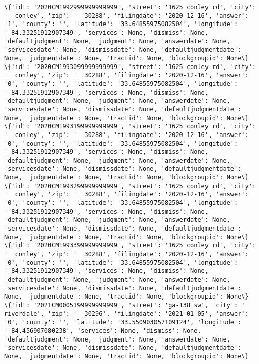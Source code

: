 \documentclass[11pt]{article}
\begin{document}
\begin{Verbatim}[commandchars=\\\{\}]
\{'id': '2020CM1992999999999999', 'street': '1625 conley rd', 'city': '  conley', 'zip': '  30288', 'filingdate': '2020-12-16', 'answer': '1', 'county': '', 'latitude': '33.64855975082504', 'longitude': '-84.33251912907349', 'services': None, 'dismiss': None, 'defaultjudgment': None, 'judgment': None, 'answerdate': None, 'servicesdate': None, 'dismissdate': None, 'defaultjudgmentdate': None, 'judgmentdate': None, 'tractid': None, 'blockgroupid': None\}
\{'id': '2020CM1993099999999999', 'street': '1625 conley rd', 'city': '  conley', 'zip': '  30288', 'filingdate': '2020-12-16', 'answer': '0', 'county': '', 'latitude': '33.64855975082504', 'longitude': '-84.33251912907349', 'services': None, 'dismiss': None, 'defaultjudgment': None, 'judgment': None, 'answerdate': None, 'servicesdate': None, 'dismissdate': None, 'defaultjudgmentdate': None, 'judgmentdate': None, 'tractid': None, 'blockgroupid': None\}
\{'id': '2020CM1993199999999999', 'street': '1625 conley rd', 'city': '  conley', 'zip': '  30288', 'filingdate': '2020-12-16', 'answer': '0', 'county': '', 'latitude': '33.64855975082504', 'longitude': '-84.33251912907349', 'services': None, 'dismiss': None, 'defaultjudgment': None, 'judgment': None, 'answerdate': None, 'servicesdate': None, 'dismissdate': None, 'defaultjudgmentdate': None, 'judgmentdate': None, 'tractid': None, 'blockgroupid': None\}
\{'id': '2020CM1993299999999999', 'street': '1625 conley rd', 'city': '  conley', 'zip': '  30288', 'filingdate': '2020-12-16', 'answer': '0', 'county': '', 'latitude': '33.64855975082504', 'longitude': '-84.33251912907349', 'services': None, 'dismiss': None, 'defaultjudgment': None, 'judgment': None, 'answerdate': None, 'servicesdate': None, 'dismissdate': None, 'defaultjudgmentdate': None, 'judgmentdate': None, 'tractid': None, 'blockgroupid': None\}
\{'id': '2020CM1993399999999999', 'street': '1625 conley rd', 'city': '  conley', 'zip': '  30288', 'filingdate': '2020-12-16', 'answer': '0', 'county': '', 'latitude': '33.64855975082504', 'longitude': '-84.33251912907349', 'services': None, 'dismiss': None, 'defaultjudgment': None, 'judgment': None, 'answerdate': None, 'servicesdate': None, 'dismissdate': None, 'defaultjudgmentdate': None, 'judgmentdate': None, 'tractid': None, 'blockgroupid': None\}
\{'id': '2021CM0005199999999999', 'street': 'ga-138 sw', 'city': '  riverdale', 'zip': '  30296', 'filingdate': '2021-01-05', 'answer': '0', 'county': '', 'latitude': '33.550903057109124', 'longitude': '-84.456907080238', 'services': None, 'dismiss': None, 'defaultjudgment': None, 'judgment': None, 'answerdate': None, 'servicesdate': None, 'dismissdate': None, 'defaultjudgmentdate': None, 'judgmentdate': None, 'tractid': None, 'blockgroupid': None\}

\end{Verbatim}
\end{document}
